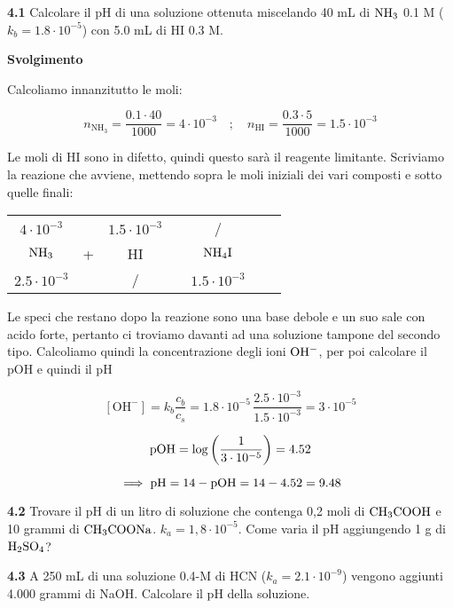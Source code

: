 \textbf{4.1} Calcolare il pH di una soluzione ottenuta miscelando 40 mL di $\rm NH_3$ 0.1 M ($k_b = 1.8 \cdot 10^{-5}$) con 5.0 mL di HI 0.3 M.

\vspace{0.2cm}\large\textbf{Svolgimento}\normalsize

\vspace{0.2cm}Calcoliamo innanzitutto le moli:

$$n_{\text{NH}_3}=\frac{0.1 \cdot 40}{1000}=4 \cdot 10^{-3}
\quad ; \quad
n_{\text{HI}}=\frac{0.3 \cdot 5}{1000}=1.5 \cdot 10^{-3}$$

Le moli di HI sono in difetto, quindi questo sarà il reagente limitante. Scriviamo la reazione che avviene, mettendo sopra le moli iniziali dei vari composti e sotto quelle finali:

\begin{center}
    \begin{tabular}{ccccccc}
        $4 \cdot 10^{-3}$ &  & $1.5 \cdot 10^{-3}$ & & /\\
        $\rm NH_3$ & + & HI & \ce{->} & $\rm NH_4I$ \\
        $2.5 \cdot 10^{-3}$ &  &  / & & $1.5 \cdot 10^{-3}$\\
    \end{tabular}
\end{center}

Le speci che restano dopo la reazione sono una base debole e un suo sale con acido forte, pertanto ci troviamo davanti ad una soluzione tampone del secondo tipo. Calcoliamo quindi la concentrazione degli ioni $\rm OH^-$, per poi calcolare il pOH e quindi il pH

$$[\text{OH}^-]=k_b\frac{c_b}{c_s}
=1.8 \cdot 10^{-5}\,\frac{2.5 \cdot 10^{-3}}{1.5 \cdot 10^{-3}}= 3 \cdot 10^{-5}$$

$$\rm pOH=\log\left(\frac{1}{3 \cdot 10^{-5}}\right)=4.52$$

$$\implies \rm pH=14-pOH=14-4.52=9.48$$

\vspace{0.2cm}\textbf{4.2} Trovare il pH di un litro di soluzione che contenga 0,2 moli di $\rm CH_3COOH$ e 10 grammi di $\rm CH_3COONa$. $k_a = 1,8 \cdot 10^{-5}$. Come varia il pH aggiungendo 1 g di $\rm H_2SO_4$?

\vspace{0.2cm}\textbf{4.3} A 250 mL di una soluzione 0.4-M di HCN ($k_a = 2.1 \cdot 10^{-9}$) vengono aggiunti 4.000 grammi di NaOH. Calcolare il pH della soluzione.

